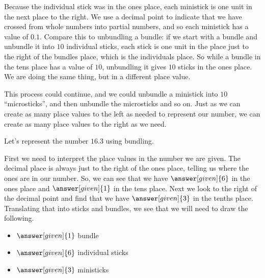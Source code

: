 \documentclass{ximera}
\begin{document}
Because the individual stick was in the ones place, each ministick is one unit in the next place to the right. We use a decimal point to indicate that we have crossed from whole numbers into partial numbers, and so each ministick has a value of $0.1$. Compare this to unbundling a bundle: if we start with a bundle and unbundle it into $10$ individual sticks, each stick is one unit in the place just to the right of the bundles place, which is the individuals place. So while a bundle in the tens place has a value of $10$, unbundling it gives $10$ sticks in the ones place. We are doing the same thing, but in a different place value.

This process could continue, and we could unbundle a ministick into $10$ ``microsticks'', and then unbundle the microsticks and so on. Just as we can create as many place values to the left as needed to represent our number, we can create as many place values to the right as we need.

\begin{example}
Let's represent the number $16.3$ using bundling.

First we need to interpret the place values in the number we are given. The decimal place is always just to the right of the ones place, telling us where the ones are in our number.  So, we can see that we have $\answer[given]{6}$ in the ones place and $\answer[given]{1}$ in the tens place. Next we look to the right of the decimal point and find that we have $\answer[given]{3}$ in the tenths place. Translating that into sticks and bundles, we see that we will need to draw the following.
\begin{itemize}
	\item $\answer[given]{1}$ bundle
	\item $\answer[given]{6}$ individual sticks
	\item $\answer[given]{3}$ ministicks
\end{itemize}

\begin{image}
\end{image}

\end{example}
\end{document}
